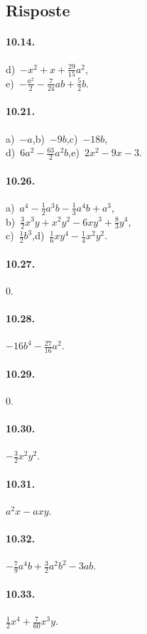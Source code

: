 \subsection{Risposte}
\begin{multicols}{2}
\paragraph{10.14.} d)~$-x^{2}+x+\frac{29}{15}a^{2}$,\protect\\ e)~$-{\frac{a^{2}}{2}}-\frac{7}{24}ab+\frac{5}{2}b$.
\paragraph{10.21.} a)~$-a$,\quad b)~$-9b$,\quad c)~$-18b$,\protect\\ d)~$6a^{2}-\frac{63}{2}a^{2}b$,\quad e)~$2x^2-9x-3$.
\paragraph{10.26.} a)~$a^{4}-\frac{1}{2}a^{3}b-\frac{1}{3}a^{4}b+a^{3}$,\protect\\ b)~$\frac{3}{2}x^{3}y+x^{2}y^{2}-6{xy}^{3}+\frac{8}{3}y^{4}$,\protect\\ c)~$\frac{1}{2}b^{3}$,\quad d)~$\frac{1}{6}xy^{4}-\frac{1}{4}x^{2}y^{2}$.
\paragraph{10.27.} $0$.
\paragraph{10.28.} $-16b^{4}-\frac{27}{16}a^{2}$.
\paragraph{10.29.} $0$.
\paragraph{10.30.} $-\frac{3}{2}x^{2}y^{2}$.
\paragraph{10.31.} $a^{2}x-axy$.
\paragraph{10.32.} $-\frac{7}{9}a^{4}b+\frac{3}{2}a^2b^2-3ab$.
\paragraph{10.33.} $\frac{1}{2}x^{4}+\frac{7}{60}x^{3}y$.

\end{multicols}

